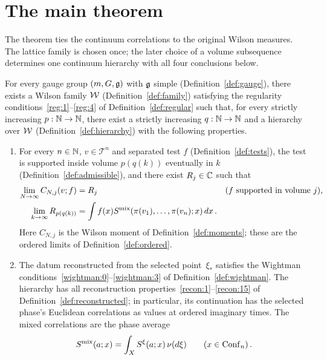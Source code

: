 \section{The main theorem}\label{subsec:main-theorem}\label{sec:theorem}

The theorem ties the continuum correlations to the original Wilson measures.
The lattice family is chosen once; the later choice of a volume subsequence determines one continuum hierarchy with all four conclusions below.

\begin{theorem}\label{thm:main}
For every gauge group $(m,G,\mathfrak g)$ with $\mathfrak g$ simple (Definition~\ref{def:gauge}), there exists a Wilson family $\mathcal W$ (Definition~\ref{def:family}) satisfying the regularity conditions~\ref{reg:1}--\ref{reg:4} of Definition~\ref{def:regular} such that, for every strictly increasing $p:\mathbb N\to\mathbb N$, there exist a strictly increasing $q:\mathbb N\to\mathbb N$ and a hierarchy over $\mathcal W$ (Definition~\ref{def:hierarchy}) with the following properties.
\begin{enumerate}[label=\textup{P\arabic*.},ref=P\arabic*]
\item\label{main:1} For every $n\in\mathbb N$, $v\in\mathcal T^n$ and separated test $f$ (Definition~\ref{def:tests}), the test is supported inside volume $p(q(k))$ eventually in $k$ (Definition~\ref{def:admissible}), and there exist $R_j\in\mathbb C$ such that
\begin{equation}\label{eq:main-limit}
\begin{aligned}
\lim_{N\to\infty}C_{N,j}(v;f)&=R_j
&&\text{($f$ supported in volume $j$)},\\
\lim_{k\to\infty}R_{p(q(k))}&=\int f(x)S^{\mathrm{mix}}(\pi(v_1),\ldots,\pi(v_n);x)\,dx\,.
\end{aligned}
\end{equation}
Here $C_{N,j}$ is the Wilson moment of Definition~\ref{def:moments}; these are the ordered limits of Definition~\ref{def:ordered}.
\item\label{main:2} The datum reconstructed from the selected point~$\xi_*$ satisfies the Wightman conditions~\ref{wightman:0}--\ref{wightman:3} of Definition~\ref{def:wightman}.
The hierarchy has all reconstruction properties~\ref{recon:1}--\ref{recon:15} of Definition~\ref{def:reconstructed}; in particular, its continuation has the selected phase's Euclidean correlations as values at ordered imaginary times.
The mixed correlations are the phase average
\begin{equation*}
S^\mix(a;x)=\int_X S^\xi(a;x)\,\nu(d\xi)\qquad(x\in\Conf n)\,.

\end{equation*}
\end{enumerate}
\end{theorem}
